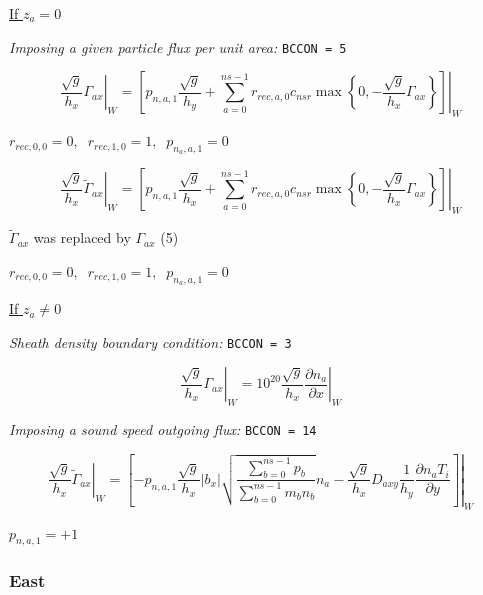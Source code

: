 \documentclass[a4paper,10pt]{report}
\begin{document}

\underline{If $z_a = 0$}

{\em Imposing a given particle flux per unit area:} {\tt BCCON = 5}

\begin{equation}
\left. \frac{\sqrt g}{h_x} \Gamma_{ax} \right|_W
=
\left. \left[
p_{n,a,1} \frac{\sqrt g}{h_y}
+
\sum \limits_{a=0}^{ns-1} r_{rec,a,0} c_{nsr}
\max \left\{0, -\frac{\sqrt g}{h_x} \Gamma_{ax} \right\}
\right] \right|_W
\end{equation}

$r_{rec,0,0} = 0,\;\; r_{rec,1,0} = 1,\;\; p_{n_a,a,1} = 0 $

\begin{equation}
\left. \frac{\sqrt g}{h_x} \widetilde{\Gamma}_{ax} \right|_W
=
\left. \left[
p_{n,a,1} \frac{\sqrt g}{h_x}
+
\sum \limits_{a=0}^{ns-1} r_{rec,a,0} c_{nsr}
\max \left\{0, -\frac{\sqrt g}{h_x} \Gamma_{ax} \right\}
\right] \right|_W
\end{equation}

$\widetilde{\Gamma}_{ax}$ was replaced by $\Gamma_{ax}$ (5)

$r_{rec,0,0} = 0,\;\; r_{rec,1,0} = 1,\;\; p_{n_a,a,1} = 0 $

\underline{If $z_a \neq 0$}

{\em Sheath density boundary condition:} {\tt BCCON = 3}

\begin{equation*}
\left. \frac{\sqrt g}{h_x} \Gamma_{ax} \right|_W = \left.
10^{20} \frac{\sqrt{g}}{h_x} \frac{\partial n_a}{\partial x}
\right|_W
\end{equation*}

{\em Imposing a sound speed outgoing flux:} {\tt BCCON = 14}

\begin{equation*}
\left. \frac{\sqrt g}{h_x} \widetilde{\Gamma}_{ax} \right|_W
=
\left. \left[
- p_{n,a,1} \frac{\sqrt g}{h_x} |b_x|
\sqrt{\frac{\sum \limits_{b=0}^{ns-1} p_b}{\sum \limits_{b=0}^{ns-1} m_b n_b}} n_a
-
\frac{\sqrt g}{h_x} D_{axy} \frac 1{h_y} \frac{\partial n_a T_i}{\partial y}
\right]
\right|_W
\end{equation*}

$p_{n,a,1} = +1 $

\subsubsection{East}
\end{document}
